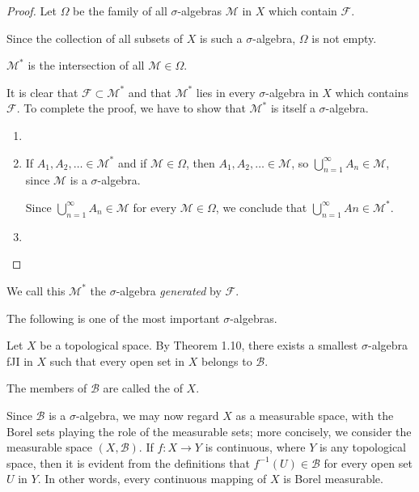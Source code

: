 \begin{proof}
Let $\Omega$ be the family of all $\sigma$-algebras $\mathcal{M}$ in $X$ which contain $\mathcal{F}$.

Since the collection of all subsets of $X$ is such a $\sigma$-algebra, $\Omega$ is not empty.
\begin{claim}
$\mathcal{M}^*$ is the intersection of all $\mathcal{M}\in\Omega$.
\end{claim}
It is clear that $\mathcal{F}\subset\mathcal{M}^*$ and that $\mathcal{M}^*$ lies in every $\sigma$-algebra in $X$ which contains $\mathcal{F}$. To complete the proof, we have to show that $\mathcal{M}^*$ is itself a $\sigma$-algebra.
\begin{enumerate}[label=(\roman*)]
\item 
\item If $A_1,A_2,\dots\in\mathcal{M}^*$ and if $\mathcal{M}\in\Omega$, then $A_1,A_2,\dots\in\mathcal{M}$, so $\bigcup_{n=1}^{\infty}A_n\in\mathcal{M}$, since $\mathcal{M}$ is a $\sigma$-algebra.

Since $\bigcup_{n=1}^{\infty}A_n\in\mathcal{M}$ for every $\mathcal{M}\in\Omega$, we conclude that $\bigcup_{n=1}^{\infty}An\in\mathcal{M}^*$.

\item 
\end{enumerate}
\end{proof}

We call this $\mathcal{M}^*$ the $\sigma$-algebra \emph{generated} by $\mathcal{F}$.

The following is one of the most important $\sigma$-algebras.

\begin{definition}
Let $X$ be a topological space. By Theorem 1.10, there exists a smallest $\sigma$-algebra fJI in $X$ such that every open set in $X$ belongs to $\mathcal{B}$.

The members of $\mathcal{B}$ are called the  of $X$. 
\end{definition}

Since $\mathcal{B}$ is a $\sigma$-algebra, we may now regard $X$ as a measurable space, with the Borel sets playing the role of the measurable sets; more concisely, we consider the measurable space $(X,\mathcal{B})$. If $f\colon X\to Y$ is continuous, where $Y$ is any topological space, then it is evident from the definitions that $f^{-1}(U)\in\mathcal{B}$ for every open set $U$ in $Y$. In other words, every continuous mapping of $X$ is Borel measurable.

